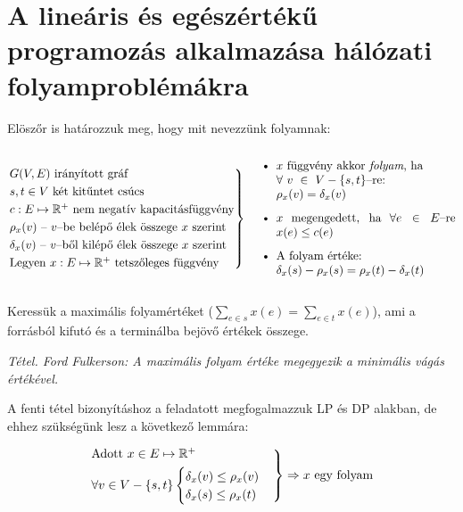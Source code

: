 \section{A lineáris és egészértékű programozás alkalmazása hálózati folyamproblémákra}

Elöszőr is határozzuk meg, hogy mit nevezzünk folyamnak: 

\[	
\begin{rcases}
G(V,E) \mbox{ irányított gráf} \\
s,t \in V \mbox{ két kitűntet csúcs} \\
c : E \mapsto \mathbb{R}^+ \mbox{ nem negatív kapacitásfüggvény}\\
\rho_x(v) \mbox{ -- } v\mbox{--be belépő élek összege } x \mbox{ szerint} \\
\delta_x(v) \mbox{ -- } v\mbox{--ből kilépő élek összege } x \mbox{ szerint}\\
\mbox{Legyen }x : E \mapsto \mathbb{R}^+ \mbox{ tetszőleges függvény}
\end{rcases} \parbox[c]{6.2cm}{
\begin{itemize}
  \item $x$ függvény akkor \emph{folyam}, ha \\ $\forall~v~\in~V - \{s,t\}$--re: \\ $\rho_x(v)=\delta_x(v)$
  \item $x$ megengedett, ha $\forall e \in E$--re $x(e) \leq c(e)$
  \item A folyam értéke: \\ $\delta_x(s)-\rho_x(s)=\rho_x(t)-\delta_x(t)$
\end{itemize}
}
\]

Keressük a maximális folyamértéket ($\sum_{e \in s}x(e)=\sum_{e \in t}x(e)$),
ami a forrásból kifutó és a terminálba bejövő értékek összege.

\vspace{0.4cm}
\emph{Tétel. Ford Fulkerson: A maximális folyam értéke megegyezik a minimális vágás értékével.}
\vspace{0.4cm}

A fenti tétel bizonyításhoz a feladatott megfogalmazzuk LP és DP alakban, de
ehhez szükségünk lesz a következő lemmára:

\[
\begin{rcases}
\mbox{Adott } x \in E \mapsto \mathbb{R}^+\\
\forall v \in V - \{s,t\} \begin{cases}
\delta_x(v) \leq \rho_x(v) \\
\delta_x(s) \leq \rho_x(t)
\end{cases} 
\end{rcases}
\Rightarrow  x \mbox{ egy folyam}
\]

